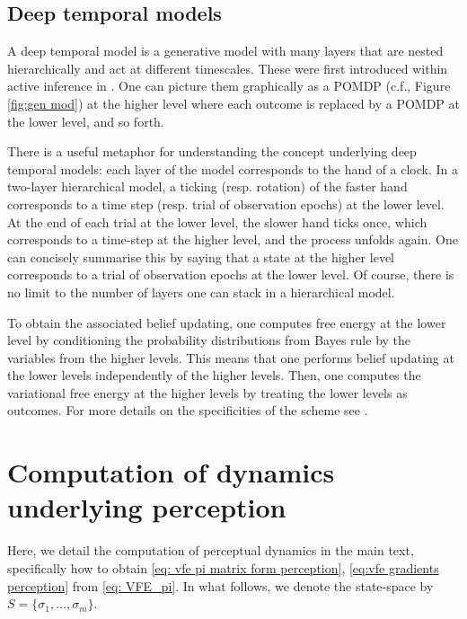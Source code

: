 \documentclass[review,12pt,authoryear]{elsarticle}
\begin{document}
\subsection{Deep temporal models}
\label{appendix: deep temporal models}

A deep temporal model is a generative model with many layers that are nested hierarchically and act at different timescales. These were first introduced within active inference in \citep{fristonActiveInferenceCuriosity2017}. One can picture them graphically as a POMDP (c.f., Figure \ref{fig:gen mod}) at the higher level where each outcome is replaced by a POMDP at the lower level, and so forth.

There is a useful metaphor for understanding the concept underlying deep temporal models: each layer of the model corresponds to the hand of a clock. In a two-layer hierarchical model, a ticking (resp. rotation) of the faster hand corresponds to a time step (resp. trial of observation epochs) at the lower level. At the end of each trial at the lower level, the slower hand ticks once, which corresponds to a time-step at the higher level, and the process unfolds again. One can concisely summarise this by saying that a state at the higher level corresponds to a trial of observation epochs at the lower level. Of course, there is no limit to the number of layers one can stack in a hierarchical model.

To obtain the associated belief updating, one computes free energy at the lower level by conditioning the probability distributions from Bayes rule by the variables from the higher levels. This means that one performs belief updating at the lower levels independently of the higher levels. Then, one computes the variational free energy at the higher levels by treating the lower levels as outcomes. For more details on the specificities of the scheme see \citep{fristonActiveInferenceCuriosity2017}.


\section{Computation of dynamics underlying perception}
\label{app: deriving perceptual dynamics}

Here, we detail the computation of perceptual dynamics in the main text, specifically how to obtain \eqref{eq: vfe pi matrix form perception}, \eqref{eq:vfe gradients perception} from \eqref{eq: VFE_pi}. In what follows, we denote the state-space by $S=\{\sigma_1,\ldots , \sigma_m\}$.
\end{document}
